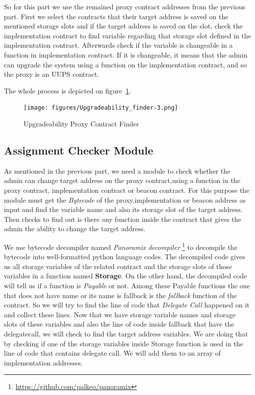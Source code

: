 So for this part we use the remained proxy contract addresses from the previous part. First we select the contracts that their target address is saved on the mentioned storage slots and if the target address is saved on the slot, check the implementation contract to find variable regarding that storage slot defined in the implementation contract. Afterwards check if the variable is changeable in a function in implementation contract. If it is changeable, it means that the admin can upgrade the system using a function on the implementation contract, and so the proxy is an UUPS contract. 

The whole process is depicted on figure~\ref{fig:finderModule}.

\begin{figure}[t!]
  \centering
  \texttt{[image: figures/Upgradeability\_finder-3.png]}\label{fig:finderModule}
  \caption{Upgradeability Proxy Contract Finder}
\end{figure}

\subsection{Assignment Checker Module}
\label{app:assignment}

As mentioned in the previous part, we need a module to check whether the admin can change target address on the proxy contract,using a function in the proxy contract, implementation contract or beacon contract. For this purpose the module must get the \textit{Bytecode} of the proxy,implementation or beacon address as input and find the variable name and also its storage slot of the target address. Then checks to find out is there any function inside the contract that gives the admin the ability to change the target address.

We use bytecode decompiler named \textit{Panoramix decompiler} \footnote{\url{https://github.com/palkeo/panoramix}} to decompile the bytecode into well-formatted python language codes. The decompiled code gives us all storage variables of the related contract and the storage slots of those variables in a function named \textbf{Storage}. On the other hand, the decompiled code will tell us if a function is \textit{Payable} or not. Among these Payable functions the one that does not have name or its name is fallback is the \textit{fallback} function of the contract. So we will try to find the line of code that \textit{Delegate Call} happened on it and collect these lines. Now that we have storage variable names and storage slots of these variables and also the line of code inside fallback that have the delegatecall, we will check to find the target address variables. We are doing that by checking if one of the storage variables inside Storage function is used in the line of code that contains delegate call. We will add them to an array of implementation addresses.

